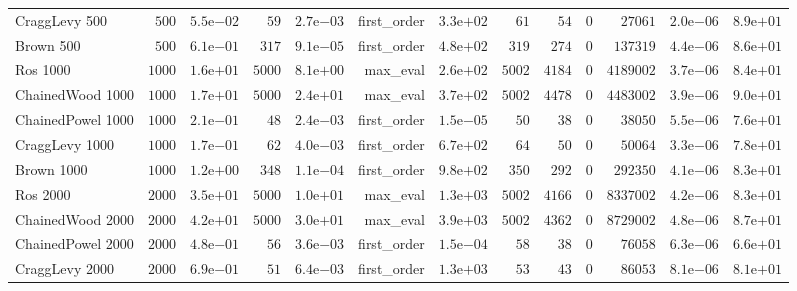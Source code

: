 \begin{longtable}[c]{lrrrrrrrrrrrr}
CraggLevy 500 & \(  500\) & \( 5.5\)e\(-02\) & \(   59\) & \( 2.7\)e\(-03\) & first\_order & \( 3.3\)e\(+02\) & \(   61\) & \(   54\) & \(    0\) & \(27061\) & \( 2.0\)e\(-06\) & \( 8.9\)e\(+01\) \\
Brown 500 & \(  500\) & \( 6.1\)e\(-01\) & \(  317\) & \( 9.1\)e\(-05\) & first\_order & \( 4.8\)e\(+02\) & \(  319\) & \(  274\) & \(    0\) & \(137319\) & \( 4.4\)e\(-06\) & \( 8.6\)e\(+01\) \\
Ros 1000 & \( 1000\) & \( 1.6\)e\(+01\) & \( 5000\) & \( 8.1\)e\(+00\) & max\_eval & \( 2.6\)e\(+02\) & \( 5002\) & \( 4184\) & \(    0\) & \(4189002\) & \( 3.7\)e\(-06\) & \( 8.4\)e\(+01\) \\
ChainedWood 1000 & \( 1000\) & \( 1.7\)e\(+01\) & \( 5000\) & \( 2.4\)e\(+01\) & max\_eval & \( 3.7\)e\(+02\) & \( 5002\) & \( 4478\) & \(    0\) & \(4483002\) & \( 3.9\)e\(-06\) & \( 9.0\)e\(+01\) \\
ChainedPowel 1000 & \( 1000\) & \( 2.1\)e\(-01\) & \(   48\) & \( 2.4\)e\(-03\) & first\_order & \( 1.5\)e\(-05\) & \(   50\) & \(   38\) & \(    0\) & \(38050\) & \( 5.5\)e\(-06\) & \( 7.6\)e\(+01\) \\
CraggLevy 1000 & \( 1000\) & \( 1.7\)e\(-01\) & \(   62\) & \( 4.0\)e\(-03\) & first\_order & \( 6.7\)e\(+02\) & \(   64\) & \(   50\) & \(    0\) & \(50064\) & \( 3.3\)e\(-06\) & \( 7.8\)e\(+01\) \\
Brown 1000 & \( 1000\) & \( 1.2\)e\(+00\) & \(  348\) & \( 1.1\)e\(-04\) & first\_order & \( 9.8\)e\(+02\) & \(  350\) & \(  292\) & \(    0\) & \(292350\) & \( 4.1\)e\(-06\) & \( 8.3\)e\(+01\) \\
Ros 2000 & \( 2000\) & \( 3.5\)e\(+01\) & \( 5000\) & \( 1.0\)e\(+01\) & max\_eval & \( 1.3\)e\(+03\) & \( 5002\) & \( 4166\) & \(    0\) & \(8337002\) & \( 4.2\)e\(-06\) & \( 8.3\)e\(+01\) \\
ChainedWood 2000 & \( 2000\) & \( 4.2\)e\(+01\) & \( 5000\) & \( 3.0\)e\(+01\) & max\_eval & \( 3.9\)e\(+03\) & \( 5002\) & \( 4362\) & \(    0\) & \(8729002\) & \( 4.8\)e\(-06\) & \( 8.7\)e\(+01\) \\
ChainedPowel 2000 & \( 2000\) & \( 4.8\)e\(-01\) & \(   56\) & \( 3.6\)e\(-03\) & first\_order & \( 1.5\)e\(-04\) & \(   58\) & \(   38\) & \(    0\) & \(76058\) & \( 6.3\)e\(-06\) & \( 6.6\)e\(+01\) \\
CraggLevy 2000 & \( 2000\) & \( 6.9\)e\(-01\) & \(   51\) & \( 6.4\)e\(-03\) & first\_order & \( 1.3\)e\(+03\) & \(   53\) & \(   43\) & \(    0\) & \(86053\) & \( 8.1\)e\(-06\) & \( 8.1\)e\(+01\) \\

\end{longtable}

